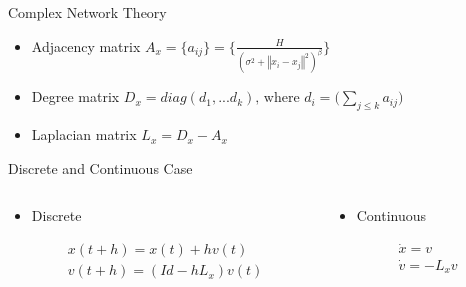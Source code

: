 \documentclass{beamer}
\begin{document}
\begin{frame}{Complex Network Theory}
	\begin{itemize}
		\item Adjacency matrix $A_x = \lbrace a_{ij}\rbrace=\bigg\lbrace\frac{H}{(\sigma^2+\left\Vert x_i - x_j \right\Vert^2)^{\beta}}\bigg\rbrace\nonumber$
		\vspace{0.5cm}
		\item Degree matrix $D_x = diag(d_1,...d_k) \text{, where } d_i=\bigg(\sum_{j\leq k}a_{ij}\bigg)$
		\vspace{0.5cm}
		\item Laplacian matrix $L_x = D_x - A_x$
	\end{itemize}
\end{frame}
\begin{frame}{Discrete and Continuous Case}
	\begin{minipage}[0.95\textheight]{\textwidth}
	\begin{columns}[T]
	\begin{column}{0.5\textwidth}
		\begin{itemize}
		  \item Discrete
		  \vspace{0.5cm}
		\end{itemize}
		\begin{align}
			&x(t+h) = x(t) + hv(t)\nonumber\\
			&v(t+h) = (Id -hL_x)v(t)\nonumber
		\end{align}
	\end{column}
	\begin{column}{0.5\textwidth}
		\begin{itemize}
		  \item Continuous
		  \vspace{0.5cm}
		\end{itemize}
		\begin{align}
			&\dot{x} = v\nonumber\\
			&\dot{v} = -L_xv\nonumber
		\end{align}
	\end{column}
	\end{columns}
	\end{minipage}
\end{frame}
\end{document}
